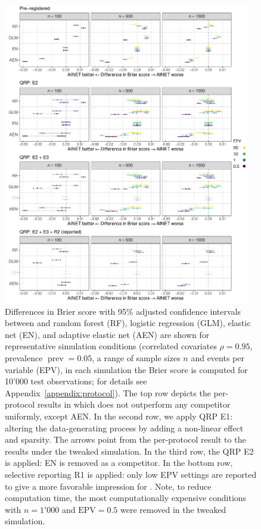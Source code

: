 \documentclass[a4paper, 11pt]{article}
\begin{document}
\begin{figure}[!htb]
  \centering
  \includegraphics[width = 0.96\textwidth]{ainet-results.pdf}
  \caption{Differences in Brier score with 95\% adjusted confidence intervals
    between \ainet{} and random forest (RF), 
    logistic regression (GLM), elastic net (EN), and adaptive elastic net (AEN)
    are shown for representative simulation conditions (correlated covariates 
    $\rho = 0.95$, prevalence $\operatorname{prev} = 0.05$, a range of sample sizes
    $n$ and events per variable (EPV), in each simulation the Brier score is computed 
    for 10'000 test observations; for details see Appendix~\ref{appendix:protocol}).
    The top row depicts the per-protocol results in which \ainet{} does not
    outperform any competitor uniformly, except AEN. In the second row, we apply
    QRP E1: altering the data-generating process by adding a non-linear effect and 
    sparsity. The arrows point from the per-protocol result to the results under the
    tweaked simulation. In the third row, the QRP E2 is applied: EN is removed as
    a competitor. In the bottom row, selective reporting R1 is applied: only low 
    EPV settings are reported to give a more favorable impression for \ainet{}.
    Note, to reduce computation time, the most computationally expensive conditions
    with $n = 1'000$ and $\mbox{EPV} = 0.5$ were removed in the tweaked simulation.
    } \label{fig:E1}
\end{figure}
\end{document}
